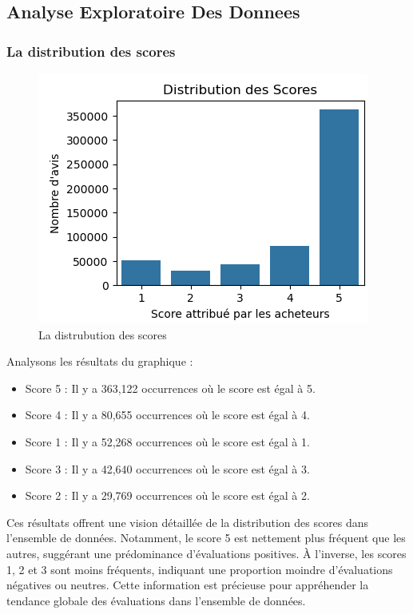 \newpage
\subsection{Analyse Exploratoire Des Donnees}
\subsubsection{La distribution des scores}
\begin{figure}[h]
    \centering
    \includegraphics[scale=0.8]{assets/distrubutiondesscores.PNG}
    \caption{La distrubution des scores}
    \label{fig:distrubution_des_scores}
\end{figure}

Analysons les résultats du graphique :

\begin{itemize}
    \item Score 5 : Il y a 363,122 occurrences où le score est égal à 5.
    \item Score 4 : Il y a 80,655 occurrences où le score est égal à 4.
    \item Score 1 : Il y a 52,268 occurrences où le score est égal à 1.
    \item Score 3 : Il y a 42,640 occurrences où le score est égal à 3.
    \item Score 2 : Il y a 29,769 occurrences où le score est égal à 2.
\end{itemize}

Ces résultats offrent une vision détaillée de la distribution des scores dans l'ensemble de données. Notamment, le score 5 est nettement plus fréquent que les autres, suggérant une prédominance d'évaluations positives. À l'inverse, les scores 1, 2 et 3 sont moins fréquents, indiquant une proportion moindre d'évaluations négatives ou neutres. Cette information est précieuse pour appréhender la tendance globale des évaluations dans l'ensemble de données.

